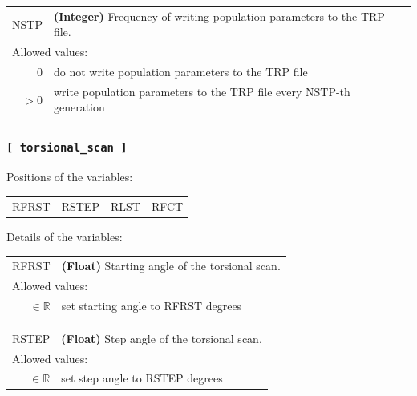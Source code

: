 \documentclass[10pt,a4paper]{report}
\numberwithin{equation}{section}
\begin{document}
{
\begin{tabular}{r@{ : }l}
\label{descr:nstp}
      NSTP&\textbf{(Integer)} Frequency of writing population parameters to the TRP file.                                              \\ 
\multicolumn{2}{l}{Allowed values:} \\ 
     \(0\)&do not write population parameters to the TRP file                                                   \\ 
    \(>0\)&write population parameters to the TRP file every NSTP-th generation                                 \\ 
\end{tabular}
\vspace{1ex}
}


\subsubsection{\texttt{[~torsional\_scan~]}}
\label{sec:inp-torsional_scan}

Positions of the variables:
\begin{center}
  \begin{tabular}{llll}
    RFRST & RSTEP & RLST & RFCT \\
  \end{tabular}
\end{center}

\noindent Details of the variables:
\vspace{2ex}

{
\begin{tabular}{r@{ : }l}
\label{descr:rfrst}
     RFRST&\textbf{(Float)} Starting angle of the torsional scan.                                                                \\ 
\multicolumn{2}{l}{Allowed values:} \\ 
\(\in\mathbb{R}\)&set starting angle to RFRST degrees                                                                  \\ 
\end{tabular}
\vspace{1ex}
}

{
\begin{tabular}{r@{ : }l}
\label{descr:rstep}
     RSTEP&\textbf{(Float)} Step angle of the torsional scan.                                                                    \\ 
\multicolumn{2}{l}{Allowed values:} \\ 
\(\in\mathbb{R}\)&set step angle to RSTEP degrees                                                                      \\ 
\end{tabular}
\vspace{1ex}
}
\end{document}
